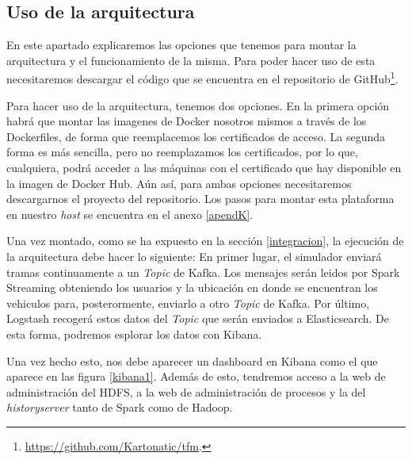 \subsection{Uso de la arquitectura\label{uso}}


En este apartado explicaremos las opciones que tenemos para 
montar la arquitectura y el funcionamiento de la
misma. Para poder hacer uso de esta necesitaremos descargar
el código que se encuentra en el repositorio de
GitHub\footnote{\url{https://github.com/Kartonatic/tfm}.}.

Para hacer uso de la arquitectura, tenemos dos opciones. En la primera
opción habrá que montar las imagenes de Docker nosotros mismos a través de
los Dockerfiles, de forma que reemplacemos los certificados de acceso. La
segunda forma es más sencilla, pero no reemplazamos los certificados, por
lo que, cualquiera, podrá acceder a las máquinas con el certificado que hay
disponible en la imagen de Docker Hub. Aún así, para ambas opciones
necesitaremos descargarnos el proyecto del repositorio. Los pasos
para montar esta plataforma en nuestro \emph{host} se encuentra
en el anexo \ref{apendK}.

Una vez montado, como se ha expuesto en la sección \ref{integracion},
la ejecución de la arquitectura debe hacer lo siguiente: En primer lugar, 
el simulador enviará tramas continuamente a un \emph{Topic} de Kafka.
Los mensajes serán leidos por Spark Streaming obteniendo los usuarios 
y la ubicación en donde se encuentran los vehiculos para, posterormente,
enviarlo a otro \emph{Topic} de Kafka. Por último, Logstash recogerá estos
datos del \emph{Topic} que serán enviados a Elasticsearch. De esta forma,
podremos esplorar los datos con Kibana.

Una vez hecho esto, nos debe aparecer un dashboard en Kibana como el que
aparece en las figura \ref{kibana1}. Además de esto, tendremos acceso a la
web de administración del HDFS, a la web de administración de procesos y
la del \emph{historyserver} tanto de Spark como de Hadoop.

